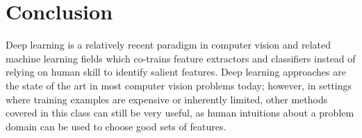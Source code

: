 ﻿\documentclass{article}
\begin{document}
 
\section{Conclusion}
Deep learning is a relatively recent paradigm in computer vision and related machine learning fields which co-trains feature extractors and classifiers instead of relying on human skill to identify salient features. Deep learning approaches are the state of the art in most computer vision problems today; however, in settings where training examples are expensive or inherently limited, other methods covered in this class can still be very useful, as human intuitions about a problem domain can be used to choose good sets of features.
\small


\end{document}
